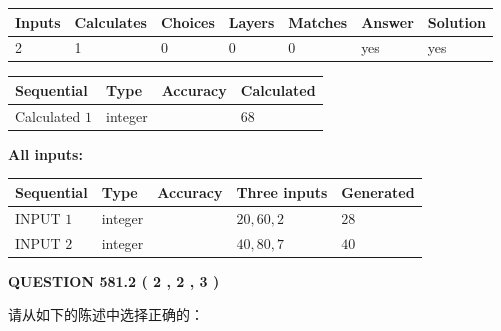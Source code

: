 \documentclass{ctexart}
\begin{document}
 
\noindent{}
 
 

 
   
   
   
   
\noindent\begin{tabular}{|l|l|l|l|l|l|l|}
 \hline
Inputs & Calculates & Choices & Layers & Matches & Answer & Solution \\ \hline
 2  & 
 1  & 
 0
  & 
 0  & 
 0  & 
  yes & 
  yes 
  \\ \hline
 \end{tabular}
   
   
   
   
\noindent{}
   
   
  
  
\noindent\begin{tabular}{|l|l|l|l|}
\hline
 Sequential & Type & Accuracy & Calculated \\ 
\hline
 
 
  Calculated $  1 $ & integer &  & 
  $ 68 $ 
 \\  \hline  
 \end{tabular}
   
   
   
   
\noindent\vspace{0.1in}\hspace{-0.08in} {\textbf{\Large{All inputs: }}}
   
   
  
  
\noindent\begin{tabular}{|l|l|l|l|l|}
\hline
 Sequential & Type & Accuracy & Three inputs & Generated \\ 
\hline
 
 
  INPUT $  1 $ & integer &  & $
 20
 , 
 60
 , 
 2
 $ & $ 28 $ 
 \\  \hline  
 
 
  INPUT $  2 $ & integer &  & $
 40
 , 
 80
 , 
 7
 $ & $ 40 $ 
 \\  \hline  
 \end{tabular}
   
   
  
\vspace{0.2in}
  
{\textbf{\Large{QUESTION
581.2 
 ( 2 , 2 , 3 )
}}}
  
  
请从如下的陈述中选择正确的：
 
\end{document}
